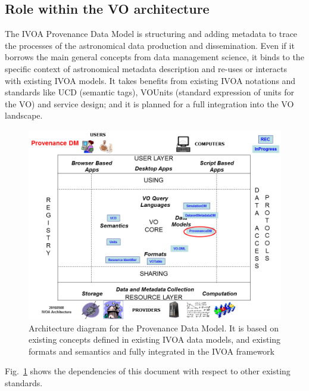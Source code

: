 \subsection{Role within the VO architecture}

The IVOA Provenance Data Model is structuring and adding metadata to trace the processes of the astronomical data production and dissemination. Even if it borrows the main general concepts from data management science, it binds to the specific context of astronomical metadata description and re-uses or interacts with existing IVOA models. It takes benefits from existing IVOA notations and standards like UCD (semantic tags), VOUnits (standard expression of units for the VO) and service design; and it is planned for a full integration into the VO landscape.

\begin{figure}[b]
\centering
\includegraphics[width=\textwidth]{VOArchitecture-Prov2016.png}
\caption[Architecture diagram for the Provenance Data Model]{Architecture diagram for the Provenance Data Model. It is based on existing concepts defined in existing IVOA data models, and existing formats and semantics and fully integrated in the IVOA framework}
\label{fig:archdiag}
\end{figure}

Fig.~\ref{fig:archdiag} shows the dependencies of this document with respect to other existing standards.
